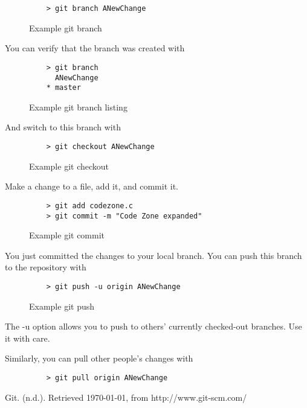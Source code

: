 \documentclass[11pt]{report}
\begin{document}
\begin{figure}[H]
  \caption{Example git branch}
  \begin{lstlisting}
    > git branch ANewChange
  \end{lstlisting}
\end{figure}

You can verify that the branch was created with

\begin{figure}[H]
  \caption{Example git branch listing}
  \begin{lstlisting}
    > git branch
      ANewChange
    * master
  \end{lstlisting}
\end{figure}

And switch to this branch with

\begin{figure}[H]
  \caption{Example git checkout}
  \begin{lstlisting}
    > git checkout ANewChange
  \end{lstlisting}
\end{figure}

Make a change to a file, add it, and commit it.

\begin{figure}[H]
  \caption{Example git commit}
  \begin{lstlisting}
    > git add codezone.c
    > git commit -m "Code Zone expanded"
    \end{lstlisting}
\end{figure}

You just committed the changes to your local branch.  You can push
this branch to the repository with

\begin{figure}[H]
  \caption{Example git push}
  \begin{lstlisting}
    > git push -u origin ANewChange
  \end{lstlisting}
\end{figure}

The -u option allows you to push to others' currently checked-out
branches. Use it with care.

Similarly, you can pull other people's changes with

\begin{figure}[H]
  \begin{lstlisting}
    > git pull origin ANewChange
  \end{lstlisting}
\end{figure}

\begin{thebibliography}{9}

    Git. (n.d.). Retrieved \today, from http://www.git-scm.com/

\end{thebibliography}
\end{document}
